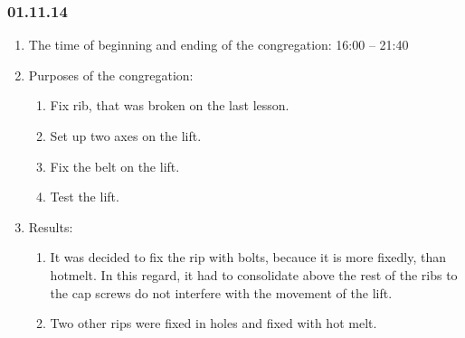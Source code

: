 
\subsubsection{01.11.14}

\begin{enumerate}
	\item The time of beginning and ending of the congregation:
	16:00 – 21:40
	\item Purposes of the congregation:
	\begin{enumerate}
	  \item Fix rib, that was broken on the last lesson.
	  
	  \item	Set up two axes on the lift.
	  
	  \item	Fix the belt on the lift.
	  
	  \item	Test the lift.
	  
    \end{enumerate}
    
	\item Results:
	\begin{enumerate}
	  \item	It was decided to fix the rip with bolts, becauce it is more fixedly, than hotmelt. In this regard, it had to consolidate above the rest of the ribs to the cap screws do not interfere with the movement of the lift.
      
      \item Two other rips were fixed in holes and fixed with hot melt.
      

\end{enumerate}
\end{enumerate}
